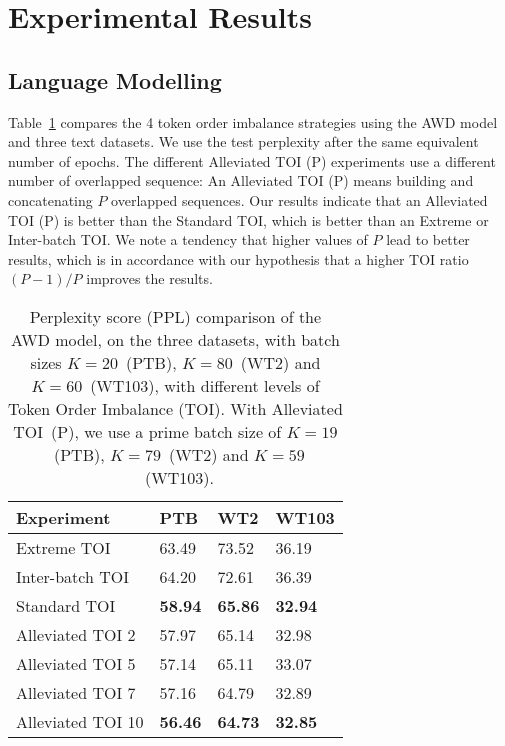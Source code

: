 \documentclass[11pt,a4paper]{article}
\begin{document}
\section{Experimental Results}
\label{sec-results}
\subsection{Language Modelling}

Table~\ref{table: orders with awd model} compares the 4 token order imbalance strategies using the AWD model and three text datasets. We use the test perplexity after the same equivalent number of epochs. The different Alleviated TOI (P) experiments use a different number of overlapped sequence: An Alleviated TOI (P) means building and concatenating $P$ overlapped sequences. Our results indicate that an Alleviated TOI (P)
is better than the Standard TOI, which is better than an Extreme or Inter-batch TOI. We note a tendency that higher values of $P$ lead to better results, which is in accordance with our hypothesis that a higher TOI ratio $(P-1)/P$ improves the results.

\begin{table}[t]
\centering

\begin{tabular}{@{}llll@{}}
\toprule
  Experiment & PTB & WT2 & WT103\\
  \midrule
  Extreme TOI       & 63.49          & 73.52          & 36.19 \\
  Inter-batch TOI   & 64.20          & 72.61          & 36.39 \\
  Standard TOI      & \textbf{58.94}         & \textbf{65.86} & \textbf{32.94} \\
  Alleviated TOI 2  & 57.97          & 65.14          & 32.98 \\
  Alleviated TOI 5  & 57.14        & 65.11          & 33.07 \\
  Alleviated TOI 7  & 57.16         & 64.79          & 32.89 \\
  Alleviated TOI 10 & \textbf{56.46} & \textbf{64.73} & \textbf{32.85} \\
\bottomrule
\end{tabular}
\caption{
    \label{table: orders with awd model}
    Perplexity score (PPL) comparison of the AWD model, on the three datasets, with batch sizes $K=20$~(PTB), $K=80$~(WT2) and $K=60$~(WT103), with different levels of Token Order Imbalance (TOI). With Alleviated TOI~(P), we use a prime batch size of $K=19$~(PTB), $K=79$~(WT2) and $K=59$~(WT103).
  }
\end{table}
\end{document}
